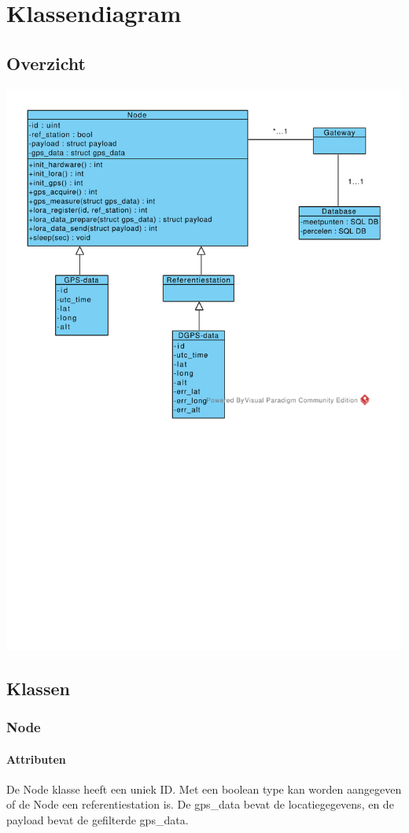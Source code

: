 \section{Klassendiagram}
\subsection{Overzicht}

\includegraphics[width=0.9\linewidth]{technical/class_diagram.pdf}

\subsection{Klassen}
\subsubsection{Node}
\paragraph{Attributen}
De Node klasse heeft een uniek ID. Met een boolean type kan worden aangegeven of de Node een referentiestation is. De gps\_data bevat de locatiegegevens, en de payload bevat de gefilterde gps\_data.

